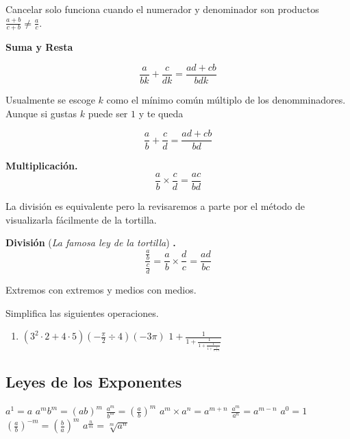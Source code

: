 \begin{moral}
    Cancelar solo funciona cuando el numerador y denominador 
    son productos $\frac{a+b}{c+b} \neq \frac{a}{c}$.
\end{moral}

\textbf{Suma y Resta}

\[\frac{a}{bk}+\frac{c}{dk} = \frac{ad+cb}{bdk}\]

Usualmente se escoge $k$ como el mínimo común múltiplo de los 
denomminadores. Aunque si gustas $k$ puede ser $1$ y te queda

\[\frac{a}{b}+\frac{c}{d} = \frac{ad+cb}{bd}\]

\textbf{Multiplicación.}
\[\frac{a}{b} \times \frac{c}{d} = \frac{ac}{bd}\]

La división es equivalente pero la revisaremos a parte por 
el método de visualizarla fácilmente de la tortilla.

\textbf{División} (\textit{La famosa ley de la tortilla}) \textbf{.}
\[\frac{\frac{a}{b}}{\frac{c}{d}} = \frac{a}{b} 
\times \frac{d}{c} = \frac{ad}{bc}\]

Extremos con extremos y medios con medios.

\begin{exercise}
    Simplifica las siguientes operaciones.
    \begin{enumerate}
        \ii $\frac{-3}{\frac{-6}{6}}$
        \ii $\left(\frac{-7.5}{3}\right)\frac{6}{5}$
        \ii $\frac{\frac{4^2}{2^2} + 1}{5^3}$
        \ii $\sqrt{12\cdot2 + 1} + \frac{14\cdot 2 + 8}{6}$
        \ii $2\cdot 3^4 + \frac{2\cdot 3^4}{3}$
        \item $(3^2 \cdot 2 + 4 \cdot 5) \left( -\frac{\pi}{2} \div 4 \right) (-3\pi)$
        \ii $1 + \frac{1}{1 + \frac{1}{1 + \frac{1}{1+\frac{1}{1+1}}}}$
    \end{enumerate}
\end{exercise}

\subsection{Leyes de los Exponentes}

\begin{enumerate}
    \ii $a^1 = a$
    \ii $a^mb^m = (ab)^m$
    \ii $\frac{a^m}{b^m} = \left(\frac{a}{b}\right)^{m}$
    \ii $a^m \times a^n = a^{m+n}$
    \ii $\frac{a^m}{a^n} = a^{m-n}$
    \ii $a^0 = 1$
    \ii $\left(\frac{a}{b}\right)^{-m} = \left(\frac{b}{a}\right)^{m}$
    \ii $a^{\frac{n}{m}} = \sqrt[m]{a^n}$   
\end{enumerate}

